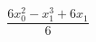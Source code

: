 \documentclass{article}
\begin{document}
\[
\frac{6 x_{0}^{2} - x_{1}^{3} + 6 x_{1}}{6}
\]
\end{document}
